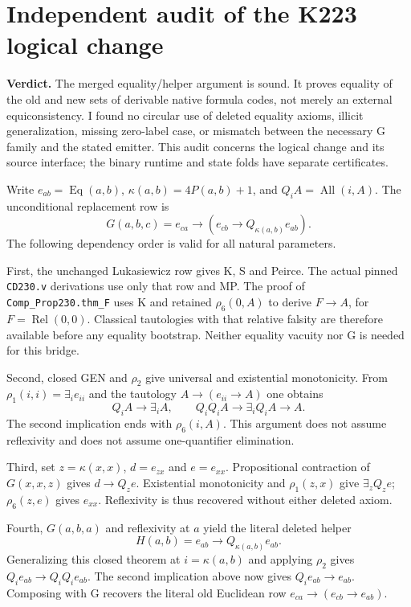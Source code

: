 \section{Independent audit of the K223 logical change}

\noindent\textbf{Verdict.} The merged equality/helper argument is sound.
It proves equality of the old and new sets of derivable native formula
codes, not merely an external equiconsistency.  I found no circular use
of deleted equality axioms, illicit generalization, missing zero-label
case, or mismatch between the necessary G family and the stated emitter.
This audit concerns the logical change and its source interface; the
binary runtime and state folds have separate certificates.

Write $e_{ab}=\operatorname{Eq}(a,b)$,
$\kappa(a,b)=4P(a,b)+1$, and $Q_iA=\operatorname{All}(i,A)$.
The unconditional replacement row is
\[
 G(a,b,c)=e_{ca}\to(e_{cb}\to Q_{\kappa(a,b)}e_{ab}).
\]
The following dependency order is valid for all natural parameters.

First, the unchanged Lukasiewicz row gives K, S and Peirce.  The actual
pinned \texttt{CD230.v} derivations use only that row and MP.  The proof
of \texttt{Comp\_Prop230.thm\_F} uses K and retained $\rho_6(0,A)$ to
derive $F\to A$, for $F=\operatorname{Rel}(0,0)$.  Classical tautologies
with that relative falsity are therefore available before any equality
bootstrap.  Neither equality vacuity nor G is needed for this bridge.

Second, closed GEN and $\rho_2$ give universal and existential
monotonicity.  From $\rho_1(i,i)=\exists_i e_{ii}$ and the tautology
$A\to(e_{ii}\to A)$ one obtains
\[
 Q_iA\to\exists_iA,
 \qquad Q_iQ_iA\to\exists_iQ_iA\to A.
\]
The second implication ends with $\rho_6(i,A)$.  This argument does not
assume reflexivity and does not assume one-quantifier elimination.

Third, set $z=\kappa(x,x)$, $d=e_{zx}$ and $e=e_{xx}$.
Propositional contraction of $G(x,x,z)$ gives $d\to Q_ze$.
Existential monotonicity and $\rho_1(z,x)$ give $\exists_zQ_ze$;
$\rho_6(z,e)$ gives $e_{xx}$.  Reflexivity is thus recovered without
either deleted axiom.

Fourth, $G(a,b,a)$ and reflexivity at $a$ yield the literal deleted helper
\[
 H(a,b)=e_{ab}\to Q_{\kappa(a,b)}e_{ab}.
\]
Generalizing this closed theorem at $i=\kappa(a,b)$ and applying
$\rho_2$ gives $Q_i e_{ab}\to Q_iQ_i e_{ab}$.  The second implication
above now gives $Q_i e_{ab}\to e_{ab}$.  Composing with G recovers
the literal old Euclidean row $e_{ca}\to(e_{cb}\to e_{ab})$.

